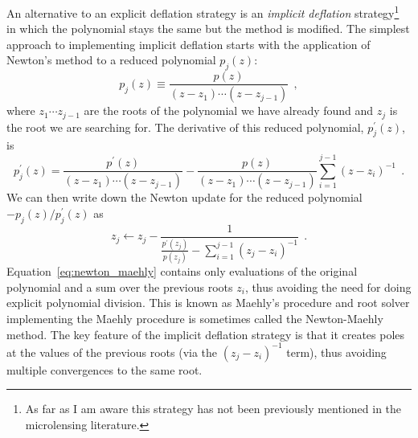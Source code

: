 \documentclass[12pt,dvipsnames]{report}
\newcommand{\ssf}[1]{\textsf{#1}}
\newcommand{\hquad}{~~}
\begin{document}
An alternative to an explicit deflation strategy is an \emph{implicit deflation}
strategy\footnote{As far as I am aware this strategy has not been previously mentioned in the 
microlensing literature.} in which the polynomial stays the same but the 
method is modified. The simplest approach to implementing implicit deflation starts with
the application of Newton's method to a reduced polynomial $p_j(z)$:
\begin{equation}
    p_{j}(z) \equiv \frac{p(z)}{\left(z-z_1\right) \cdots\left(z-z_{j-1}\right)}\hquad ,
    \label{eq:reduced_poly}
\end{equation}
where $z_1\cdots z_{j-1}$ are the roots of the polynomial we have already found and
$z_j$ is the root we are searching for.
The derivative of this reduced polynomial, $p^\prime_j(z)$, is
\begin{equation}
    p_{j}^{\prime}(z)=\frac{p^{\prime}(z)}{\left(z-z_1\right) \cdots\left(z-z_{j-1}\right)}-\frac{p(z)}{\left(z-z_1\right) \cdots\left(z-z_{j-1}\right)} \sum_{i=1}^{j-1}\left(z-z_{i}\right)^{-1}\hquad .
\end{equation}
We can then write down the Newton update for the reduced polynomial 
$-p_j(z)/p_j^{\prime}(z)$
as
\begin{equation}
    z_j \leftarrow z_j - \frac{1}{\frac{p^\prime (z_j)}{p(z_j)} - \sum_{i=1}^{j-1}\left(z_j-z_{i}\right)^{-1}}\hquad .
    \label{eq:newton_maehly}
\end{equation}
Equation~\ref{eq:newton_maehly} contains only evaluations of the original polynomial 
and a sum over the previous roots $z_i$, thus avoiding the need for doing explicit polynomial 
division.  This is known as \ssf{Maehly's procedure} and root solver implementing the 
Maehly procedure is sometimes called the \ssf{Newton-Maehly} method.
The key feature of the implicit deflation strategy is that it creates poles at the
values of the previous roots (via the $(z_j-z_i)^{-1}$ term), thus avoiding multiple
convergences to the same root.
\end{document}

